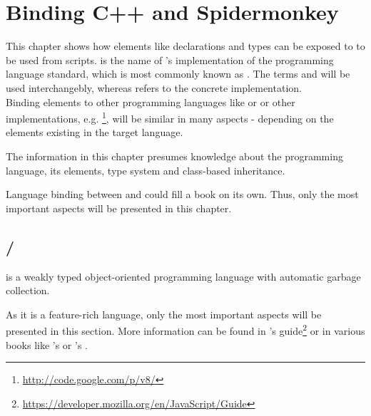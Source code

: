 \chapter{Binding C++ and Spidermonkey}
\label{chap:LanguageBindingCPPJS}

This chapter shows how  elements like declarations and types can be exposed to  to be used from scripts.  is the name of 's implementation of the  programming language standard, which is most commonly known as . The terms  and  will be used interchangebly, whereas  refers to the concrete  implementation.\\
Binding  elements to other programming languages like  or  or other  implementations, e.g. \footnote{\url{http://code.google.com/p/v8/}}, will be similar in many aspects - depending on the elements existing in the target language.

The information in this chapter presumes knowledge about the  programming language, its elements, type system and class-based inheritance.

Language binding between  and  could fill a book on its own. Thus, only the most important aspects will be presented in this chapter.

\section{/}
\label{sec:JavaScript}

 is a weakly typed object-oriented programming language with automatic garbage collection. 

As it is a feature-rich language, only the most important aspects will be presented in this section. More information can be found in 's  guide\footnote{\url{https://developer.mozilla.org/en/JavaScript/Guide}} or in various books like 's  or 's .

